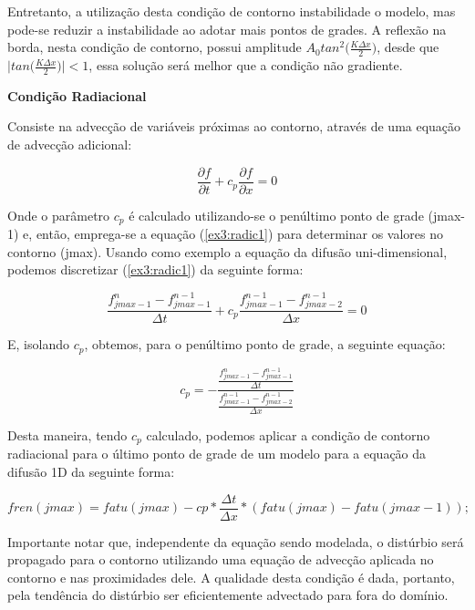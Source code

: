 \documentclass[11pt]{article}
\begin{document}
Entretanto, a utilização desta condição de contorno instabilidade o
modelo, mas pode-se reduzir a instabilidade ao adotar mais pontos de
grades. A reflexão na borda, nesta condição de contorno, possui
amplitude \(A_0tan^2\bigg( \frac{K\Delta{x}}{2} \bigg)\), desde que
\(\bigg| tan\bigg( \frac{K\Delta{x}}{2} \bigg) \bigg| < 1\), essa
solução será melhor que a condição não gradiente.

\textbf{Condição Radiacional}

Consiste na advecção de variáveis próximas ao contorno, através de uma
equação de advecção adicional:

\begin{equation}
    \frac{\partial{f}}{\partial{t}} + c_p\frac{\partial{f}}{\partial{x}} = 0
    \label{ex3:radic1}
\end{equation}

Onde o parâmetro \(c_p\) é calculado utilizando-se o penúltimo ponto de
grade (jmax-1) e, então, emprega-se a equação (\ref{ex3:radic1}) para
determinar os valores no contorno (jmax). Usando como exemplo a equação
da difusão uni-dimensional, podemos discretizar (\ref{ex3:radic1}) da
seguinte forma:

\begin{equation}
    \frac{f^{n}_{jmax-1} - f^{n-1}_{jmax-1}}{\Delta{t}} + c_p\frac{f^{n-1}_{jmax-1} - f^{n-1}_{jmax-2}}{\Delta{x}} = 0
    \label{ex3:radic2}
\end{equation}

E, isolando \(c_p\), obtemos, para o penúltimo ponto de grade, a
seguinte equação:

\begin{equation}
    c_p = -\frac{ \frac{f^{n}_{jmax-1} - f^{n-1}_{jmax-1}}{\Delta{t}} }{ \frac{f^{n-1}_{jmax-1} - f^{n-1}_{jmax-2}}{\Delta{x}} }
    \label{ex3:radic3}
\end{equation}

Desta maneira, tendo \(c_p\) calculado, podemos aplicar a condição de
contorno radiacional para o último ponto de grade de um modelo para a
equação da difusão 1D da seguinte forma:

\begin{equation}
    fren(jmax)=fatu(jmax) - cp*\frac{\Delta{t}}{\Delta{x}}*(fatu(jmax) - fatu(jmax-1));
\end{equation}

Importante notar que, independente da equação sendo modelada, o
distúrbio será propagado para o contorno utilizando uma equação de
advecção aplicada no contorno e nas proximidades dele. A qualidade desta
condição é dada, portanto, pela tendência do distúrbio ser
eficientemente advectado para fora do domínio.
\end{document}
